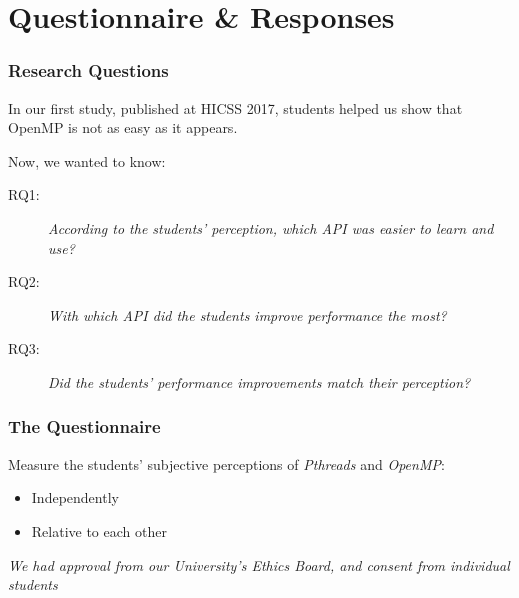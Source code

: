 \documentclass[10pt, compress, aspectratio=169]{beamer}
\begin{document}
\section{Questionnaire \& Responses}

\begin{frame}
    \frametitle{Research Questions}
    In our first study, published at HICSS 2017, students helped us show that
    \alert{OpenMP is not as easy as it appears}.

    \pause

    Now, we wanted to know:

    \begin{description}
        \item[RQ1:] \textit{According to the students' perception, which API was
            easier to learn and use?}
        \item[RQ2:] \textit{With which API did the students improve performance the
            most?}
        \item[RQ3:] \textit{Did the students' performance improvements match their
            perception?}
    \end{description}
\end{frame}

\begin{frame}
    \frametitle{The Questionnaire}
    Measure the students' \alert{subjective perceptions} of \textit{Pthreads}
    and \textit{OpenMP}:

    \begin{itemize}
        \item Independently
        \item Relative to each other
    \end{itemize}

    \pause

    \textit{We had approval from our University's Ethics Board, and consent
    from individual students}
\end{frame}
\end{document}
